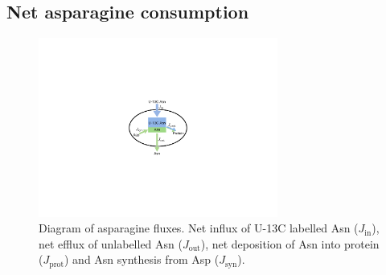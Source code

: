 \subsection{Net asparagine consumption}



\begin{figure}
    \centering
    \includegraphics[width=0.70\textwidth]{figures/chap2/asn_Jprot.pdf}
    \caption[Asparagine consumption fluxes]{
    Diagram of asparagine fluxes.
    Net influx of U-13C labelled Asn ($J_{\text{in}}$), net efflux of unlabelled Asn ($J_{\text{out}}$), net deposition of Asn into protein ($J_{\text{prot}}$) and Asn synthesis from Asp ($J_{\text{syn}}$).
    }
    \label{fig:ch2:asn_Jprot}
\end{figure}








